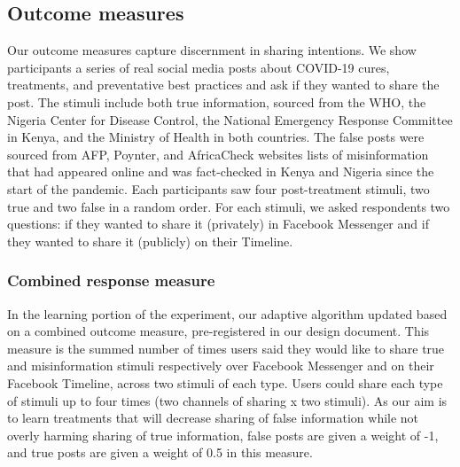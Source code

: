 \documentclass[letterpaper, 12pt, parskip=full,DIV=10]{scrartcl}
\begin{document}
\subsection{Outcome measures}\label{section:measures}
Our outcome measures capture discernment in sharing intentions. We show participants a series of real social media posts about COVID-19 cures, treatments, and preventative best practices and ask if they wanted to share the post.  The stimuli include both true information, sourced from the WHO, the Nigeria Center for Disease Control, the National Emergency Response Committee in Kenya, and the Ministry of Health in both countries. The false posts were sourced from AFP, Poynter, and AfricaCheck websites lists of misinformation that had appeared online and was fact-checked in Kenya and Nigeria since the start of the pandemic.  Each participants saw four post-treatment stimuli, two true and two false in a random order. For each stimuli, we asked respondents two questions: if they wanted to share it (privately) in Facebook Messenger and if they wanted to share it (publicly) on their Timeline. 

\subsubsection{Combined response measure}
In the learning portion of the experiment, our adaptive algorithm updated based on a combined outcome measure, pre-registered in our design document. This measure is the summed number of times users said they would like to share true and misinformation stimuli respectively over Facebook Messenger and on their Facebook Timeline, across two stimuli of each type. Users could share each type of stimuli up to four times (two channels of sharing x two stimuli). As our aim is to learn treatments that will decrease sharing of false information while not overly harming sharing of true information, false posts are given a weight of -1, and true posts are given a weight of 0.5 in this measure. 
\end{document}
